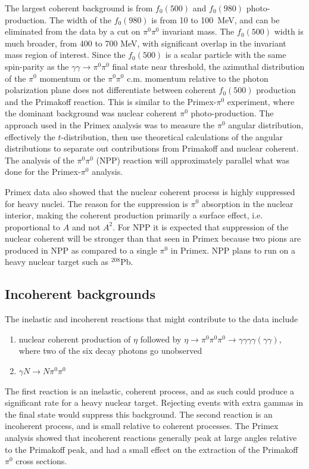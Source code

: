  The largest coherent background is
from $f_0(500)$ and $f_0(980)$ photo-production.  The width of the
$f_0(980)$ is from 10 to 100~MeV, and can be eliminated from the data
by a cut on $\pi^0\pi^0$ invariant mass.  The $f_0(500)$ width is much
broader, from 400 to 700 MeV, with significant overlap in the
invariant mass region of interest.  Since the $f_0(500)$ is a scalar
particle with the same spin-parity as the $\gamma \gamma \rightarrow
\pi^0\pi^0$ final state near threshold, the azimuthal distribution of
the $\pi^0$ momentum or the $\pi^0\pi^0$ c.m. momentum relative to the
photon polarization plane does not differentiate between coherent
$f_0(500)$ production and the Primakoff reaction.  This is similar to
the Primex-$\pi^0$ experiment, where the dominant background was
nuclear coherent $\pi^0$ photo-production.  The approach used in the
Primex analysis was to measure the $\pi^0$ angular distribution,
effectively the $t$-distribution, then use theoretical calculations of
the angular distributions to separate out contributions from Primakoff
and nuclear coherent. The analysis of the $\pi^0\pi^0$ (NPP) reaction
will approximately parallel what was done for the Primex-$\pi^0$
analysis.

Primex data also showed that the nuclear coherent process is highly
suppressed for heavy nuclei.  The reason for the suppression is
$\pi^0$ absorption in the nuclear interior, making the coherent
production primarily a surface effect, i.e. proportional to $A$ and
not $A^2$.  For NPP it is expected that suppression of the nuclear
coherent will be stronger than that seen in Primex because two pions
are produced in NPP as compared to a single $\pi^0$ in Primex.  NPP
plans to run on a heavy nuclear target such as $^{208}$Pb.


\subsection{Incoherent backgrounds}


The inelastic and incoherent reactions that might contribute to the
data include
\begin{enumerate}[label=(\roman*)]
    \item nuclear coherent production of $\eta$ followed by $\eta\rightarrow \pi^0\pi^0\pi^0 \rightarrow \gamma\gamma\gamma\gamma(\gamma\gamma)$, where two of the six decay photons go unobserved
    \item $\gamma N \rightarrow N \pi^0\pi^0$
\end{enumerate}

The first reaction is an inelastic, coherent process, and as such
could produce a significant rate for a heavy nuclear target. Rejecting
events with extra gammas in the final state would suppress this
background.  The second reaction is an incoherent process, and is
small relative to coherent processes.  The Primex analysis showed that
incoherent reactions generally peak at large angles relative to the
Primakoff peak, and had a small effect on the extraction of the
Primakoff $\pi^0$ cross sections.